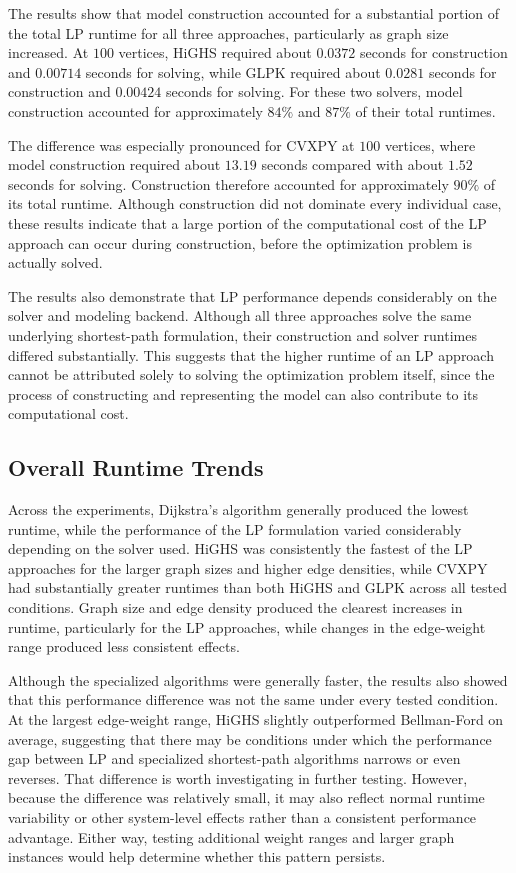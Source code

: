 \documentclass[12pt]{report}
\begin{document}
The results show that model construction accounted for a substantial portion of the total LP runtime for all three approaches, particularly as graph size increased. At $100$ vertices, HiGHS required about $0.0372$ seconds for construction and $0.00714$ seconds for solving, while GLPK required about $0.0281$ seconds for construction and $0.00424$ seconds for solving. For these two solvers, model construction accounted for approximately $84\%$ and $87\%$ of their total runtimes.

The difference was especially pronounced for CVXPY at $100$ vertices, where model construction required about $13.19$ seconds compared with about $1.52$ seconds for solving. Construction therefore accounted for approximately $90\%$ of its total runtime. Although construction did not dominate every individual case, these results indicate that a large portion of the computational cost of the LP approach can occur during construction, before the optimization problem is actually solved.

The results also demonstrate that LP performance depends considerably on the solver and modeling backend. Although all three approaches solve the same underlying shortest-path formulation, their construction and solver runtimes differed substantially. This suggests that the higher runtime of an LP approach cannot be attributed solely to solving the optimization problem itself, since the process of constructing and representing the model can also contribute to its computational cost. 

\subsection{Overall Runtime Trends}

Across the experiments, Dijkstra's algorithm generally produced the lowest runtime, while the performance of the LP formulation varied considerably depending on the solver used. HiGHS was consistently the fastest of the LP approaches for the larger graph sizes and higher edge densities, while CVXPY had substantially greater runtimes than both HiGHS and GLPK across all tested conditions. Graph size and edge density produced the clearest increases in runtime, particularly for the LP approaches, while changes in the edge-weight range produced less consistent effects.

Although the specialized algorithms were generally faster, the results also showed that this performance difference was not the same under every tested condition. At the largest edge-weight range, HiGHS slightly outperformed Bellman-Ford on average, suggesting that there may be conditions under which the performance gap between LP and specialized shortest-path algorithms narrows or even reverses. That difference is worth investigating in further testing. However, because the difference was relatively small, it may also reflect normal runtime variability or other system-level effects rather than a consistent performance advantage. Either way, testing additional weight ranges and larger graph instances would help determine whether this pattern persists.
\end{document}
